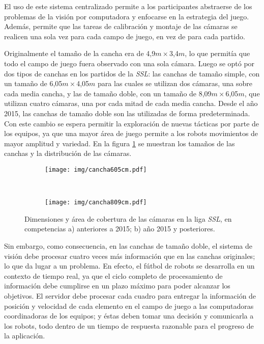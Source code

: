 El uso de este sistema centralizado permite a los participantes abstraerse de
los problemas de la visión por computadora y enfocarse en la estrategia del
juego. Además, permite que las tareas de calibración y montaje de las cámaras se
realicen una sola vez para cada campo de juego, en vez de para cada partido.

Originalmente el tamaño de la cancha era de 4,9$m\times$3,4$m$, lo que
permitía que todo el campo de juego fuera observado con una sola cámara. Luego
se optó por dos tipos de canchas en los partidos de la \emph{SSL}: las canchas
de tamaño simple, con un tamaño de 6,05$m\times$4,05$m$ para las cuales se
utilizan dos cámaras, una sobre cada media cancha, y las de tamaño doble, con
un tamaño de 8,09$m\times$6,05$m$, que utilizan cuatro cámaras, una por cada
mitad de cada media cancha. Desde el año 2015, las canchas de tamaño doble son
las utilizadas de forma predeterminada\cite{sslrules2015}. Con este cambio se
espera permitir la exploración de nuevas tácticas por parte de los equipos, ya
que una mayor área de juego permite a los robots movimientos de mayor amplitud
y variedad. En la figura \ref{cancha} se muestran los tamaños de las canchas y
la distribución de las cámaras.

\begin{figure}[!h]

	\centering

	\begin{subfigure}{0.33652\textwidth}
		\texttt{[image: img/cancha605cm.pdf]}
		\caption{}
	\end{subfigure}
	~
	\begin{subfigure}{0.45\textwidth}
		\texttt{[image: img/cancha809cm.pdf]}
		\caption{}
	\end{subfigure}

	\caption{Dimensiones y área de cobertura de las cámaras en la liga
	\emph{SSL}, en competencias a) anteriores a 2015; b) año 2015 y
	posteriores.}

	\label{cancha}

\end{figure}

Sin embargo, como consecuencia, en las canchas de tamaño doble, el sistema de
visión debe procesar cuatro veces más información que en las canchas originales;
lo que da lugar a un problema. En efecto, el fútbol de robots se desarrolla en
un contexto de tiempo real, ya que el ciclo completo de procesamiento de
información debe cumplirse en un plazo máximo para poder alcanzar los objetivos.
El servidor debe procesar cada cuadro para entregar la información de posición y
velocidad de cada elemento en el campo de juego a las computadoras coordinadoras
de los equipos; y éstas deben tomar una decisión y comunicarla a los robots,
todo dentro de un tiempo de respuesta razonable para el progreso de la
aplicación.

